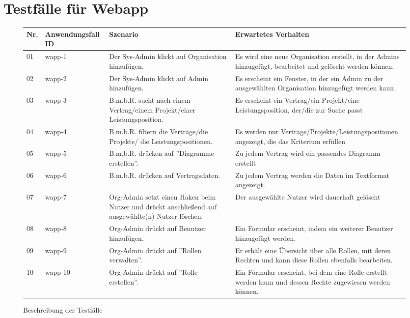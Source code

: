 \section{Testfälle für Webapp}
\begin{figure}[!h]
	\begin{center}
		\begin{tabularx}{\textwidth}{ p{} | p{} | p{} | X }
			\textbf{Nr.} & \textbf{Anwendungsfall ID} & \textbf{Szenario} & \textbf{Erwartetes Verhalten} \\ \hline
			01 & wapp-1 & Der Sys-Admin klickt auf Organisation hinzufügen. & Es wird eine neue Organisation erstellt, in der Admins hinzugefügt, bearbeitet und gelöscht werden können. \\ \hline
			02 & wapp-2 & Der Sys-Admin klickt auf Admin hinzufügen. & Es erscheint ein Fenster, in der ein Admin zu der ausgewählten Organisation hinzugefügt werden kann. \\ \hline
			03 & wapp-3 & B.m.b.R. sucht nach einem Vertrag/einem Projekt/einer Leistungsposition. & Es erscheint ein Vertrag/ein Projekt/eine Leistungsposition, der/die zur Suche passt \\ \hline
			04 & wapp-4 & B.m.b.R. filtern die Verträge/die Projekte/ die Leistungspositionen. & Es werden nur Verträge/Projekte/Leistungspositionen angezeigt, die das Kriterium erfüllen \\ \hline
			05 & wapp-5 & B.m.b.R. drücken auf ''Diagramme erstellen''. & Zu jedem Vertrag wird ein passendes Diagramm erstellt \\ \hline
			06 & wapp-6 & B.m.b.R. drücken auf Vertragsdaten. & Zu jedem Vertrag werden die Daten im Textformat angezeigt. \\ \hline 
			07& wapp-7 & Org-Admin setzt einen Haken beim Nutzer und drückt anschließend auf ausgewählte(n) Nutzer löschen. & Der ausgewählte Nutzer wird dauerhaft gelöscht \\ \hline
			08 & wapp-8 & Org-Admin drückt auf Benutzer hinzufügen. & Ein Formular erscheint, indem ein weiterer Benutzer hinzugefügt werden. \\ \hline
			09 & wapp-9 & Org-Admin drückt auf ''Rollen verwalten''. & Er erhält eine Übersicht über alle Rollen, mit deren Rechten und kann diese Rollen ebenfalls bearbeiten. \\ \hline
			10 & wapp-10 & Org-Admin drückt auf ''Rolle erstellen''. & Ein Formular erscheint, bei dem eine Rolle erstellt werden kann und dessen Rechte zugewiesen werden können. \\ \hline
		\end{tabularx}	
	\end{center}
	\caption{Beschreibung der Testfälle}
	\label{fig:testfaelle-web-app-tabelle}
\end{figure}

